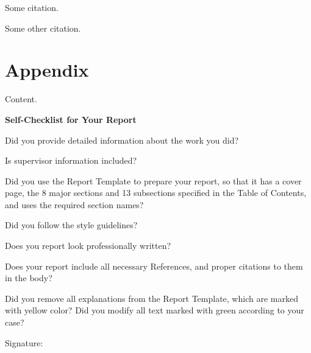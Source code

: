\documentclass[10pt]{article}
\begin{document}
\begin{thebibliography}{99}

 Some citation.

 Some other citation.

\end{thebibliography}

\section{Appendix}

Content.

\newpage

\begin{large}
\begin{center}
\textbf{Self-Checklist for Your Report}
\end{center}
\end{large}

\begin{todolist}
\item Did you provide detailed information about the work you did?
\item Is supervisor information included?
\item Did you use the Report Template to prepare your report, so that it has a cover page, the 8 major sections and 13 subsections specified in the Table of Contents, and uses the  required section names?
\item Did you follow the style guidelines?
\item Does you report look professionally written?
\item Does your report include all necessary References, and proper citations to them in the body?
\item Did you remove all explanations from the Report Template, which are marked with yellow color? Did you modify all text marked with green according to your case? 
\end{todolist}

Signature: \hrulefill
\end{document}
